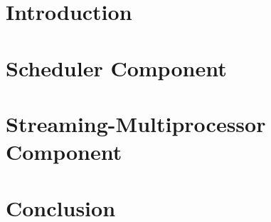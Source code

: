 \documentclass[pdf,ps2pdf,12pt,report,strict,blank]{SANDreport}
\begin{document}
    \SANDmain		%

   \chapter{Introduction}
      \label{Intro}
      

   \chapter{Scheduler Component}
      \label{sec:sched-comp}
      

   \chapter{Streaming-Multiprocessor Component}
      \label{sec:sm-comp}
      

%       

   \chapter{Conclusion}
      

    \nocite{*}


    \clearpage
    \providecommand*{\phantomsection}{}
    \phantomsection
    
    


% 	
%
%
% 	


    
\end{document}

